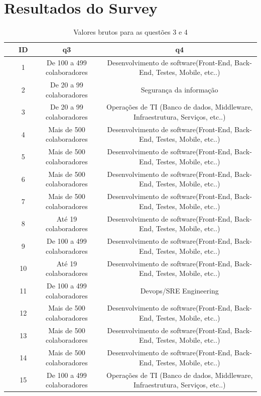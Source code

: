 \documentclass[twoside,english,brazilian]{UNISINOSartigo}
\begin{document}
\section{Resultados do Survey}

\begin{table}[h]
\footnotesize
    \caption{Valores brutos para as questões 3 e 4}
    \begin{tabularx}{\columnwidth}{cccc}
    \hline
        ~ & ID & q3 & q4 \\ \hline
~ & 1 & De 100 a 499 colaboradores & Desenvolvimento de software(Front-End, Back-End, Testes, Mobile, etc..) \\
~ & 2 & De 20 a 99 colaboradores & Segurança da informação \\
~ & 3 & De 20 a 99 colaboradores & Operações de TI (Banco de dados, Middleware, Infraestrutura, Serviços, etc..) \\
~ & 4 & Mais de 500 colaboradores & Desenvolvimento de software(Front-End, Back-End, Testes, Mobile, etc..) \\
~ & 5 & Mais de 500 colaboradores & Desenvolvimento de software(Front-End, Back-End, Testes, Mobile, etc..) \\
~ & 6 & Mais de 500 colaboradores & Desenvolvimento de software(Front-End, Back-End, Testes, Mobile, etc..) \\
~ & 7 & Mais de 500 colaboradores & Desenvolvimento de software(Front-End, Back-End, Testes, Mobile, etc..) \\
~ & 8 & Até 19 colaboradores & Desenvolvimento de software(Front-End, Back-End, Testes, Mobile, etc..) \\
~ & 9 & De 100 a 499 colaboradores & Desenvolvimento de software(Front-End, Back-End, Testes, Mobile, etc..) \\
~ & 10 & Até 19 colaboradores & Desenvolvimento de software(Front-End, Back-End, Testes, Mobile, etc..) \\
~ & 11 & De 100 a 499 colaboradores & Devops/SRE Engineering \\
~ & 12 & Mais de 500 colaboradores & Desenvolvimento de software(Front-End, Back-End, Testes, Mobile, etc..) \\
~ & 13 & Mais de 500 colaboradores & Desenvolvimento de software(Front-End, Back-End, Testes, Mobile, etc..) \\
~ & 14 & Mais de 500 colaboradores & Desenvolvimento de software(Front-End, Back-End, Testes, Mobile, etc..) \\
~ & 15 & De 100 a 499 colaboradores & Operações de TI (Banco de dados, Middleware, Infraestrutura, Serviços, etc..) \\

\end{tabularx}
\end{table}
\end{document}

